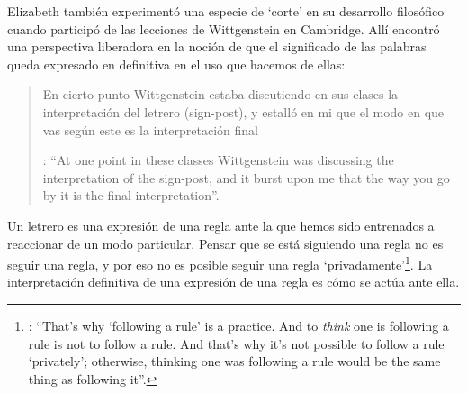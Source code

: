 Elizabeth también experimentó una especie de `corte' en su desarrollo filosófico cuando participó de las lecciones de Wittgenstein en Cambridge. Allí encontró una perspectiva liberadora en la noción de que el significado de las palabras queda expresado en definitiva en el uso que hacemos de ellas: \blockquote[{\Cite[viii]{anscombe1981metaphysics}}: \enquote{At one point in these classes Wittgenstein was discussing the interpretation of the sign-post, and it burst upon me that the way you go by it is the final interpretation}.]{En cierto punto Wittgenstein estaba discutiendo en sus clases la interpretación del letrero (sign-post), y estalló en mi que el modo en que vas según este es la interpretación final}. Un letrero es una expresión de una regla ante la que hemos sido entrenados a reaccionar de un modo particular. Pensar que se está siguiendo una regla no es seguir una regla, y por eso no es posible seguir una regla `privadamente'\footnote{\cite[Cf.][\S202]{wittgenstein1953phiinv}: \enquote{That's why `following a rule' is a practice. And to \emph{think} one is following a rule is not to follow a rule. And that's why it's not possible to follow a rule `privately'; otherwise, thinking one was following a rule would be the same thing as following it}.}. La interpretación definitiva de una expresión de una regla es cómo se actúa ante ella.

